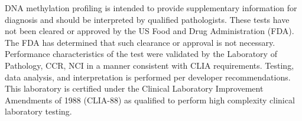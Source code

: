 DNA methylation profiling is intended to provide supplementary information for diagnosis and should be interpreted by qualified pathologists. These tests have not been cleared or approved by the US Food and Drug Administration (FDA). The FDA has determined that such clearance or approval is not necessary. Performance characteristics of the test were validated by the Laboratory of Pathology, CCR, NCI in a manner consistent with CLIA requirements. Testing, data analysis, and interpretation is performed per developer recommendations. This laboratory is certified under the Clinical Laboratory Improvement Amendments of 1988 (CLIA-88) as qualified to perform high complexity clinical laboratory testing.
